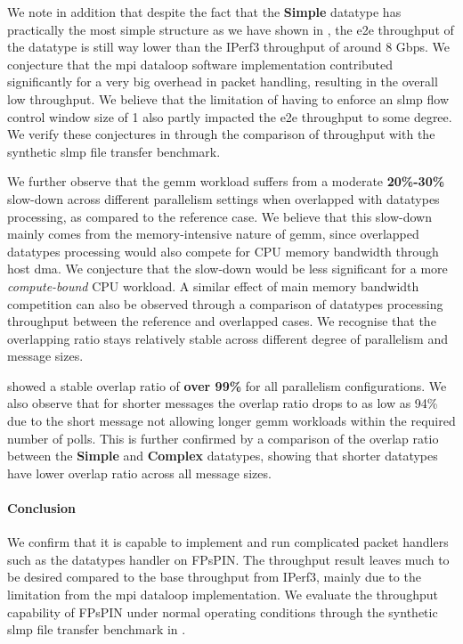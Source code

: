 We note in addition that despite the fact that the \textbf{Simple} datatype has practically the most simple structure as we have shown in , the \ac{e2e} throughput of the datatype is still way lower than the IPerf3 throughput of around 8 Gbps.  We conjecture that the \ac{mpi} dataloop software implementation contributed significantly for a very big overhead in packet handling, resulting in the overall low throughput.  We believe that the limitation of having to enforce an \ac{slmp} flow control window size of 1 also partly impacted the \ac{e2e} throughput to some degree.  We verify these conjectures in  through the comparison of throughput with the synthetic \ac{slmp} file transfer benchmark.

We further observe that the \ac{gemm} workload suffers from a moderate \textbf{20\%-30\%} slow-down across different parallelism settings when overlapped with datatypes processing, as compared to the reference case.  We believe that this slow-down mainly comes from the memory-intensive nature of \ac{gemm}, since overlapped datatypes processing would also compete for CPU memory bandwidth through host \ac{dma}.  We conjecture that the slow-down would be less significant for a more \emph{compute-bound} CPU workload.  A similar effect of main memory bandwidth competition can also be observed through a comparison of datatypes processing throughput between the reference and overlapped cases.
We recognise that the overlapping ratio stays relatively stable across different degree of parallelism and message sizes.  

 showed a stable overlap ratio of \textbf{over 99\%} for all parallelism configurations.  We also observe that for shorter messages the overlap ratio drops to as low as 94\% due to the short message not allowing longer \ac{gemm} workloads within the required number of polls.  This is further confirmed by a comparison of the overlap ratio between the \textbf{Simple} and \textbf{Complex} datatypes, showing that shorter datatypes have lower overlap ratio across all message sizes.

\paragraph{Conclusion} We confirm that it is capable to implement and run complicated packet handlers such as the datatypes handler on FPsPIN.  The throughput result leaves much to be desired compared to the base throughput from IPerf3, mainly due to the limitation from the \ac{mpi} dataloop implementation.  We evaluate the throughput capability of FPsPIN under normal operating conditions through the synthetic \ac{slmp} file transfer benchmark in .

